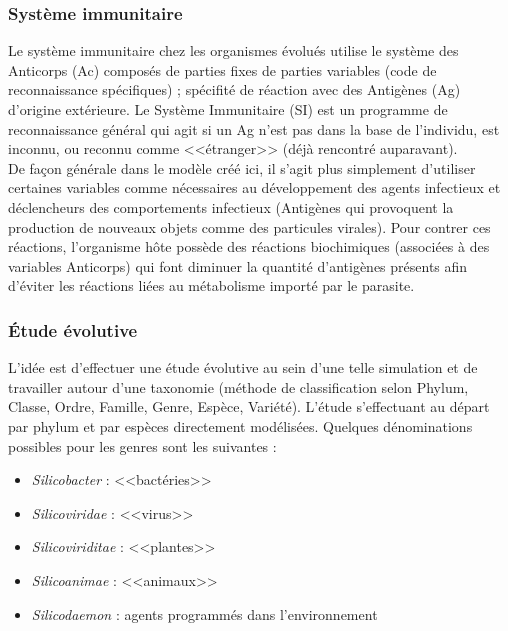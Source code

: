 \documentclass[11pt,twoside,a4paper]{article}
\begin{document}
\subsubsection{Syst{\`e}me immunitaire}

Le syst{\`e}me immunitaire chez les organismes {\'e}volu{\'e}s utilise le syst{\`e}me des Anticorps (Ac) compos{\'e}s de parties fixes de  parties variables (code de reconnaissance sp{\'e}cifiques) ; sp{\'e}cifit{\'e} de r{\'e}action avec des Antig{\`e}nes (Ag) d'origine ext{\'e}rieure. Le Syst{\`e}me Immunitaire (SI) est un programme de reconnaissance g{\'e}n{\'e}ral qui agit si un Ag n'est pas dans la base de l'individu, est inconnu, ou reconnu comme <<{\'e}tranger>> (d{\'e}j{\`a} rencontr{\'e} auparavant).~\\

De fa\c{c}on g{\'e}n{\'e}rale dans le mod{\`e}le cr{\'e}{\'e} ici, il s'agit plus simplement d'utiliser certaines variables comme n{\'e}cessaires au d{\'e}veloppement des agents infectieux et d{\'e}clencheurs des comportements infectieux (Antig{\`e}nes qui provoquent la production de nouveaux objets comme des particules virales). Pour contrer ces r{\'e}actions, l'organisme h{\^o}te poss{\`e}de des r{\'e}actions biochimiques (associ{\'e}es {\`a} des variables Anticorps) qui font diminuer la quantit{\'e} d'antig{\`e}nes pr{\'e}sents afin d'{\'e}viter les r{\'e}actions li{\'e}es au m{\'e}tabolisme import{\'e} par le parasite. 

\subsubsection{{\'E}tude {\'e}volutive}

L'id{\'e}e est d'effectuer une {\'e}tude {\'e}volutive au sein d'une telle simulation et de travailler autour d'une taxonomie (m{\'e}thode de classification selon Phylum, Classe, Ordre, Famille, Genre, Esp{\`e}ce, Vari{\'e}t{\'e}). L'{\'e}tude s'effectuant au d{\'e}part par phylum et par esp{\`e}ces directement mod{\'e}lis{\'e}es. Quelques d{\'e}nominations possibles pour les genres sont les suivantes : 
\begin{itemize}
	\item \emph{Silicobacter} : <<bact{\'e}ries>>
	\item \emph{Silicoviridae} : <<virus>>
	\item \emph{Silicoviriditae} : <<plantes>>
	\item \emph{Silicoanimae} : <<animaux>>
	\item \emph{Silicodaemon} : agents programm{\'e}s dans l'environnement
\end{itemize}
\end{document}
